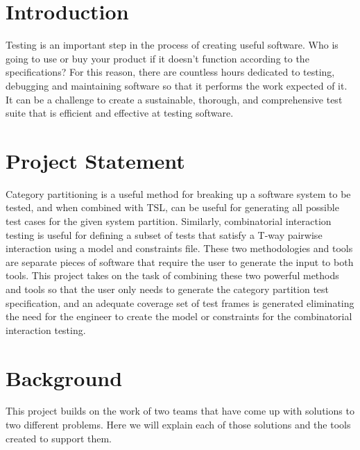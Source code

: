 \documentclass[a4full,12pt]{article}
\begin{document}
\maketitle
\section{Introduction}
Testing is an important step in the process of creating useful software. Who is
  going to use or buy your product if it doesn’t function according to the 
  specifications?  For this reason, there are countless hours dedicated to 
  testing, debugging and maintaining software so that it performs the work 
  expected of it. It can be a challenge to create a sustainable, thorough, and 
  comprehensive test suite that is efficient and effective at testing software.
  
\section{Project Statement}
Category partitioning is a useful method for breaking up a software system to be
  tested, and when combined with TSL, can be useful for generating all possible 
  test cases for the given system partition. Similarly, combinatorial 
  interaction testing is useful for defining a subset of tests that satisfy a 
  T-way pairwise interaction using a model and constraints file. These two 
  methodologies and tools are separate pieces of software that require the user 
  to generate the input to both tools. This project takes on the task of 
  combining these two powerful methods and tools so that the user only needs to 
  generate the category partition test specification, and an adequate coverage 
  set of test frames is generated eliminating the need for the engineer to 
  create the model or constraints for the combinatorial interaction testing.
  
\section{Background}
This project builds on the work of two teams that have come up with solutions to
  two different problems. Here we will explain each of those solutions and the 
  tools created to support them.
\end{document}
